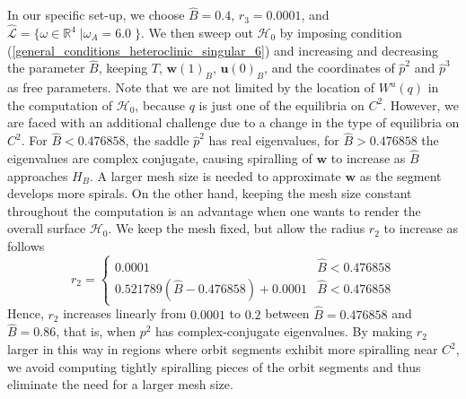 \documentclass{ws-ijbc}
\begin{document}
In our specific set-up, we choose $\widehat{B}=0.4$, $r_3 = 0.0001$, and $\widehat{\mathscr{L}}=\{ \omega \in \mathbb{R}^4 \; | \omega_A = 6.0\; \}$.  We then sweep out $\mathscr{H}_0$ by imposing condition (\ref{general_conditions_heteroclinic_singular_6}) and increasing and decreasing the parameter $\widehat{B}$, keeping $T$, $\mathbf{w}(1)_B$, $\mathbf{u}(0)_B$, and the coordinates of $\widehat{p}^2$ and $\widehat{p}^3$ as free parameters.  Note that we are not limited by the location of $W^u(q)$ in the computation of $\mathscr{H}_0$, because $q$ is just one of the equilibria on $C^2$.  However, we are faced with an additional challenge due to a change in the type of equilibria on $C^2$.  For $\widehat{B} < 0.476858$, the saddle $\widehat{p}^2$ has real eigenvalues, for $\widehat{B} > 0.476858$ the eigenvalues are complex conjugate, causing spiralling of $\mathbf{w}$ to increase as $\widehat{B}$ approaches $H_B$.  A larger mesh size is needed to approximate $\mathbf{w}$ as the segment develops more spirals.  On the other hand, keeping the mesh size constant throughout the computation is an advantage when one wants to render the overall surface $\mathscr{H}_0$.  We keep the mesh fixed, but allow the radius $r_2$ to increase as follows
\[r_2= \begin{cases} 
      0.0001 & \widehat {B} < 0.476858 \\
      0.521789(\widehat{B} - 0.476858) + 0.0001 & \widehat {B} < 0.476858
   \end{cases}
\]
Hence, $r_2$ increases linearly from $0.0001$ to $0.2$ between $\widehat{B}=0.476858$ and $\widehat{B}=0.86$, that is, when $p^2$ has complex-conjugate eigenvalues. By making $r_2$ larger in this way in regions where orbit segments exhibit more spiralling near $C^2$, we avoid computing tightly spiralling pieces of the orbit segments and thus eliminate the need for a larger mesh size.
\end{document}
